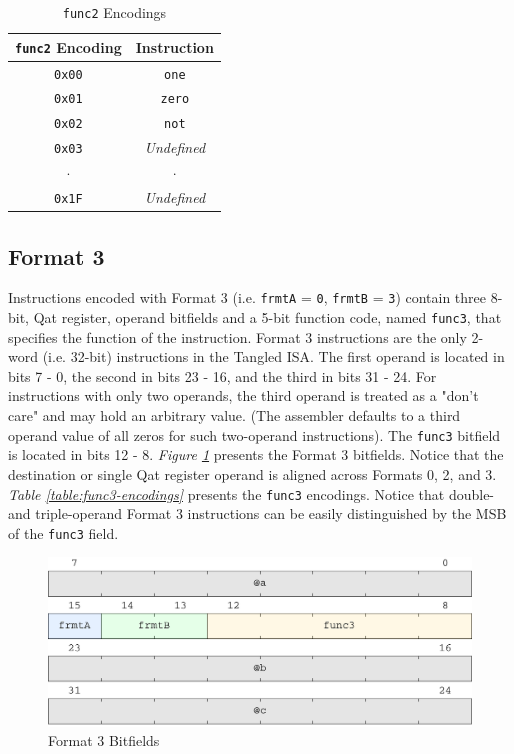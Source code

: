 \documentclass[sigconf, nonacm=true, screen=true]{acmart}
\begin{document}
\begin{center}
    \begin{table}[h]
        \begin{tabular}{cc}
            \toprule
            \texttt{func2} Encoding & Instruction \\
            \midrule
            \texttt{0x00} & \texttt{one} \\
            \texttt{0x01} & \texttt{zero} \\
            \texttt{0x02} & \texttt{not} \\
            \texttt{0x03} & \textit{Undefined} \\
            \(\cdot\) & \(\cdot\) \\
            \texttt{0x1F} & \textit{Undefined} \\
            \bottomrule
        \end{tabular}
        \caption{\texttt{func2} Encodings}
        \label{table:func2-encodings}
    \end{table}
\end{center}


\subsection{Format 3}
Instructions encoded with Format 3 (i.e. \texttt{frmtA} = \texttt{0}, \texttt{frmtB} = \texttt{3}) contain three 8-bit, Qat register, operand bitfields and a 5-bit function code, named \texttt{func3}, that specifies the function of the instruction. Format 3 instructions are the only 2-word (i.e. 32-bit) instructions in the Tangled ISA. The first operand is located in bits 7 - 0, the second in bits 23 - 16, and the third in bits 31 - 24. For instructions with only two operands, the third operand is treated as a "don't care" and may hold an arbitrary value. (The assembler defaults to a third operand value of all zeros for such two-operand instructions). The \texttt{func3} bitfield is located in bits 12 - 8. \textit{Figure \ref{figure:format3-bitfields}} presents the Format 3 bitfields. Notice that the destination or single Qat register operand is aligned across Formats 0, 2, and 3. \textit{Table \ref{table:func3-encodings}} presents the \texttt{func3} encodings. Notice that double- and triple-operand Format 3 instructions can be easily distinguished by the MSB of the \texttt{func3} field. 

\begin{figure}[h]
    \includegraphics[width=\columnwidth]{bitfields/format3_2-lane.pdf}
    \caption{Format 3 Bitfields}
    \label{figure:format3-bitfields}
\end{figure}
\end{document}
